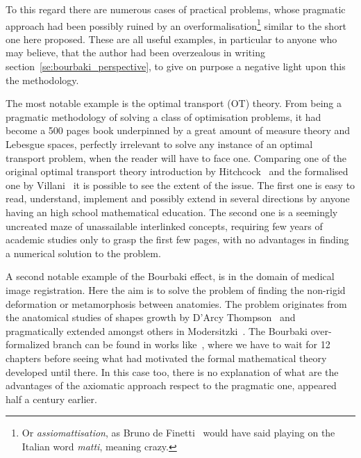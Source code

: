 \documentclass[]{scrartcl}
\theoremstyle{definition}
\begin{document}
To this regard there are numerous cases of practical problems, whose pragmatic approach had been possibly ruined by an overformalisation\footnote{
    Or \emph{assiomattisation}, as Bruno de Finetti~\cite{de2008bruno} would have said playing on the Italian word \emph{matti}, meaning crazy.
} similar to the short one here proposed. These are all useful examples, in particular to anyone who may believe, that the author had been overzealous in writing section~\ref{se:bourbaki_perspective}, to give on purpose a negative light upon this the methodology.

The most notable example is the optimal transport (OT) theory. From being a pragmatic methodology of solving a class of optimisation problems, it had become a 500 pages book underpinned by a great amount of measure theory and Lebesgue spaces, perfectly irrelevant to solve any instance of an optimal transport problem, when the reader will have to face one. Comparing one of the original optimal transport theory introduction by Hitchcock~\cite{hitchcock1941distribution} and the formalised one by Villani~\cite{villani2003topics} it is possible to see the extent of the issue. The first one is easy to read, understand, implement and possibly extend in several directions by anyone having an high school mathematical education. The second one is a seemingly uncreated maze of unassailable interlinked concepts, requiring few years of academic studies only to grasp the first few pages, with no advantages in finding a numerical solution to the problem. %

A second notable example of the Bourbaki effect, is in the domain of medical image registration. Here the aim is to solve the problem of finding the non-rigid deformation or metamorphosis between anatomies. The problem originates from the anatomical studies of shapes growth by D'Arcy Thompson~\cite{d1942growth} and pragmatically extended amongst others in Modersitzki~\cite{modersitzki2004numerical}. The Bourbaki over-formalized branch can be found in works like~\cite{younes2010shapes}, where we have to wait for 12 chapters before seeing what had motivated the formal mathematical theory developed until there. 
In this case too, there is no explanation of what are the advantages of the axiomatic approach respect to the pragmatic one, appeared half a century earlier.
\end{document}
